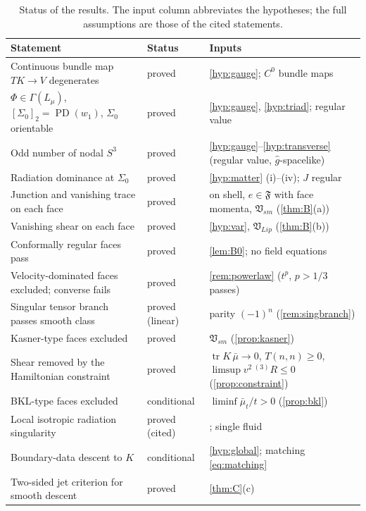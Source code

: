 \documentclass[11pt]{article}
\theoremstyle{canonmath}
\theoremstyle{canonpostulate}
\theoremstyle{canonproposition}
\theoremstyle{canonmath}
\theoremstyle{canonproposition}
\providecommand{\Lmu}{\mathcal{L}_\mu}
\providecommand{\Vb}{\mathcal{V}}
\providecommand{\PD}{\operatorname{PD}}
\providecommand{\Vlip}{\mathfrak{V}_{\mathrm{Lip}}}
\providecommand{\Vsm}{\mathfrak{V}_{\mathrm{sm}}}
\providecommand{\Fcl}{\mathfrak{F}}
\providecommand{\Klein}{\mathcal{K}}
\def\mathrm#1{#1}%
\def\mathcal#1{#1}%
\begin{document}
\begin{table}[H]
\centering
\caption{Status of the results. The input column abbreviates the hypotheses; the full assumptions are those of the cited statements.}
\label{tab:status}
\renewcommand{\arraystretch}{1.05}
\begin{tabularx}{\textwidth}{>{\raggedright\arraybackslash}p{5.6cm} >{\raggedright\arraybackslash}p{2.2cm} >{\raggedright\arraybackslash}X}
\toprule
\textbf{Statement} & \textbf{Status} & \textbf{Inputs} \\
\midrule
Continuous bundle map $T\Klein\to\Vb$ degenerates & proved & \ref{hyp:gauge}; $C^0$ bundle maps \\
$\Phi\in\Gamma(\Lmu)$, $[\Sigma_0]_2 = \PD(w_1)$, $\Sigma_0$ orientable & proved & \ref{hyp:gauge}, \ref{hyp:triad}; regular value \\
Odd number of nodal $S^3$ & proved & \ref{hyp:gauge}--\ref{hyp:transverse} (regular value, $\hat g$-spacelike) \\
Radiation dominance at $\Sigma_0$ & proved & \ref{hyp:matter} (i)--(iv); $J$ regular \\
Junction and vanishing trace on each face & proved & on shell, $e\in\Fcl$ with face momenta, $\Vsm$ (\cref{thm:B}(a)) \\
Vanishing shear on each face & proved & \ref{hyp:var}, $\Vlip$ (\cref{thm:B}(b)) \\
Conformally regular faces pass & proved & \cref{lem:B0}; no field equations \\
Velocity-dominated faces excluded; converse fails & proved & \cref{rem:powerlaw} ($t^p$, $p>1/3$ passes) \\
Singular tensor branch passes smooth class & proved (linear) & parity $(-1)^n$ (\cref{rem:singbranch}) \\
Kasner-type faces excluded & proved & $\Vsm$ (\cref{prop:kasner}) \\
Shear removed by the Hamiltonian constraint & proved & $\operatorname{tr}K\,\bar\mu\to0$, $T(n,n)\ge0$, $\limsup v^2\,{}^{(3)}\!R\le0$ (\cref{prop:constraint}) \\
BKL-type faces excluded & conditional & $\liminf\bar\mu_t/t>0$ (\cref{prop:bkl}) \\
Local isotropic radiation singularity & proved (cited) & \cite{ClaudelNewman1998,AnguigeTod1999a}; single fluid \\
Boundary-data descent to $\Klein$ & conditional & \ref{hyp:global}; matching \eqref{eq:matching} \\
Two-sided jet criterion for smooth descent & proved & \cref{thm:C}(c) \\

\end{tabularx}
\end{table}
\end{document}
